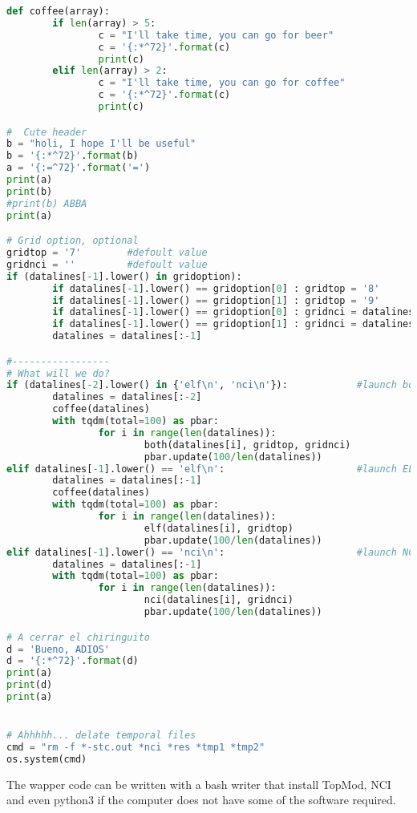\begin{lstlisting}[language=Python]
def coffee(array):
        if len(array) > 5:
                c = "I'll take time, you can go for beer"
                c = '{:*^72}'.format(c)
                print(c)
        elif len(array) > 2:
                c = "I'll take time, you can go for coffee"
                c = '{:*^72}'.format(c)
                print(c)

#  Cute header
b = "holi, I hope I'll be useful"
b = '{:*^72}'.format(b)
a = '{:=^72}'.format('=')
print(a)
print(b)
#print(b) ABBA
print(a)

# Grid option, optional
gridtop = '7'        #defoult value 
gridnci = ''         #defoult value 
if (datalines[-1].lower() in gridoption):
        if datalines[-1].lower() == gridoption[0] : gridtop = '8'
        if datalines[-1].lower() == gridoption[1] : gridtop = '9'
        if datalines[-1].lower() == gridoption[0] : gridnci = datalines[-1].upper()
        if datalines[-1].lower() == gridoption[1] : gridnci = datalines[-1].upper()
        datalines = datalines[:-1]

#-----------------
# What will we do?
if (datalines[-2].lower() in {'elf\n', 'nci\n'}):            #launch both
        datalines = datalines[:-2]
        coffee(datalines)
        with tqdm(total=100) as pbar:
                for i in range(len(datalines)):
                        both(datalines[i], gridtop, gridnci)
                        pbar.update(100/len(datalines))
elif datalines[-1].lower() == 'elf\n':                       #launch ELF
        datalines = datalines[:-1]
        coffee(datalines)
        with tqdm(total=100) as pbar:
                for i in range(len(datalines)):
                        elf(datalines[i], gridtop)
                        pbar.update(100/len(datalines))
elif datalines[-1].lower() == 'nci\n':                       #launch NCI
        datalines = datalines[:-1]
        with tqdm(total=100) as pbar:
                for i in range(len(datalines)):
                        nci(datalines[i], gridnci)
                        pbar.update(100/len(datalines))

# A cerrar el chiringuito 
d = 'Bueno, ADIOS'
d = '{:*^72}'.format(d)
print(a)
print(d)
print(a)


# Ahhhhh... delate temporal files
cmd = "rm -f *-stc.out *nci *res *tmp1 *tmp2"
os.system(cmd)
\end{lstlisting}

\newpage
The wapper code can be written with a bash writer that install
TopMod, NCI and even python3 if the computer does not have some of the software required.

